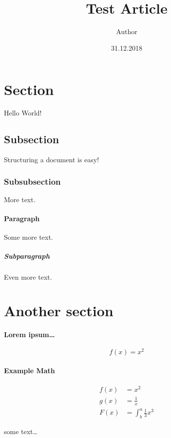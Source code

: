 \documentclass{article}
\title{Test Article}
\date{31.12.2018}
\author{Author}
\begin{document}

  \maketitle

  \newpage


  \section{Section}
  Hello World!

  \subsection{Subsection}
  Structuring a document is easy!

  \subsubsection{Subsubsection}
  More text.
  
  \paragraph{Paragraph}
  Some more text.
  
  \subparagraph{Subparagraph}
  Even more text.
  
  \section{Another section}

  \paragraph{Lorem ipsum…}
  \begin{equation}
    f(x) = x^2
  \end{equation}

  \paragraph{Example Math}
  \begin{align*}
    f(x) &= x^2\\
    g(x) &= \frac{1}{x}\\
    F(x) &= \int^a_b \frac{1}{3}x^3
  \end{align*}

  some text…
\end{document}
